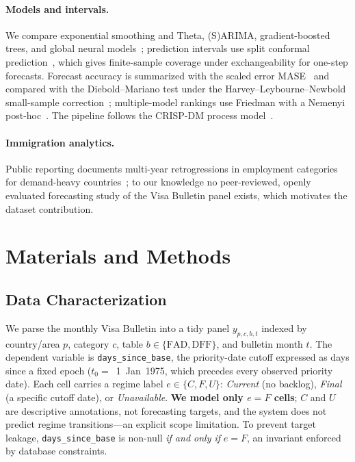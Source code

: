 \documentclass[runningheads]{llncs}
\begin{document}
\paragraph{Models and intervals.} We compare exponential smoothing and Theta,
(S)ARIMA, gradient-boosted trees, and global neural
models~\cite{salinas2020,oreshkin2020,nie2023}; prediction intervals use split conformal
prediction~\cite{vovk2005,romano2019}, which gives finite-sample coverage under
exchangeability for one-step forecasts. Forecast accuracy is summarized with the
scaled error MASE~\cite{hyndman2006} and compared with the Diebold--Mariano test
under the Harvey--Leybourne--Newbold small-sample correction~\cite{diebold1995,harvey1997};
multiple-model rankings use Friedman with a Nemenyi post-hoc~\cite{demsar2006}. The
pipeline follows the CRISP-DM process model~\cite{chapman2000}.

\paragraph{Immigration analytics.} Public reporting documents multi-year
retrogressions in employment categories for demand-heavy countries~\cite{bier2023};
to our knowledge no peer-reviewed, openly evaluated forecasting study of the Visa
Bulletin panel exists, which motivates the dataset contribution.

\section{Materials and Methods}
\label{sec:methods}

\subsection{Data Characterization}
\label{sec:data}

We parse the monthly Visa Bulletin into a tidy panel $y_{p,c,b,t}$ indexed by
country/area $p$, category $c$, table $b\in\{\mathrm{FAD},\mathrm{DFF}\}$, and
bulletin month $t$. The dependent variable is \texttt{days\_since\_base}, the
priority-date cutoff expressed as days since a fixed epoch ($t_0=$~1~Jan~1975, which
precedes every observed priority date). Each cell carries a regime label
$e\in\{C,F,U\}$: \emph{Current} (no backlog), \emph{Final} (a specific cutoff
date), or \emph{Unavailable}. \textbf{We model only $e=F$ cells}; $C$ and $U$ are
descriptive annotations, not forecasting targets, and the system does not predict
regime transitions---an explicit scope limitation. To prevent target leakage,
\texttt{days\_since\_base} is non-null \emph{if and only if} $e=F$, an invariant
enforced by database constraints.
\end{document}
